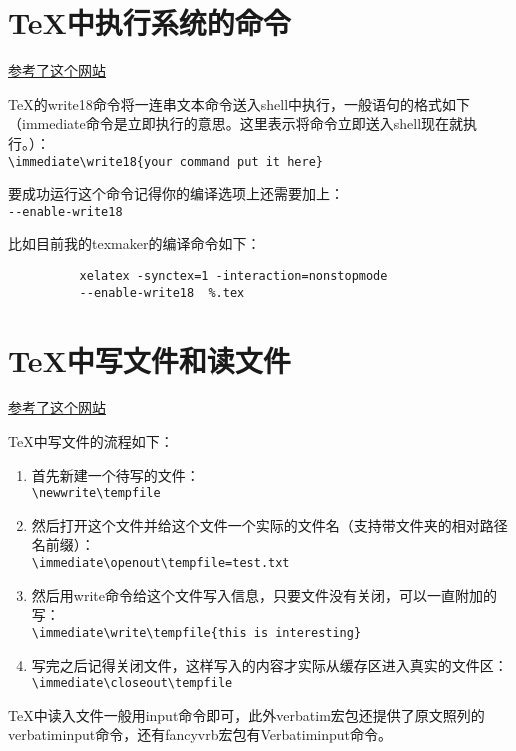\documentclass[11pt,oneside]{book}
\begin{document}
        \section{TeX中执行系统的命令}
        \href{http://tex.stackexchange.com/questions/20444/what-are-immediate-write18-and-how-does-one-use-them}{参考了这个网站}

        \TeX 的write18命令将一连串文本命令送入shell中执行，一般语句的格式如下（immediate命令是立即执行的意思。这里表示将命令立即送入shell现在就执行。）：\\
        \verb+\immediate\write18{your command put it here}+

        要成功运行这个命令记得你的编译选项上还需要加上：\\
        \verb+--enable-write18+

        比如目前我的texmaker的编译命令如下：
        \begin{Verbatim}
          xelatex -synctex=1 -interaction=nonstopmode
          --enable-write18  %.tex
        \end{Verbatim}


        \section{TeX中写文件和读文件}
        \href{http://stackoverflow.com/questions/2115379/write-and-read-from-a-latex-temporary-file}{参考了这个网站}

        TeX中写文件的流程如下：
        \begin{enumerate}
        \item 首先新建一个待写的文件：\\
          \verb+\newwrite\tempfile+
        \item 然后打开这个文件并给这个文件一个实际的文件名（支持带文件夹的相对路径名前缀）：\\
          \verb+\immediate\openout\tempfile=test.txt+
        \item 然后用write命令给这个文件写入信息，只要文件没有关闭，可以一直附加的写：\\
          \verb+\immediate\write\tempfile{this is interesting}+
        \item 写完之后记得关闭文件，这样写入的内容才实际从缓存区进入真实的文件区：\\
          \verb+\immediate\closeout\tempfile+
        \end{enumerate}

        TeX中读入文件一般用input命令即可，此外verbatim宏包还提供了原文照列的verbatiminput命令，还有fancyvrb宏包有Verbatiminput命令。
\end{document}
